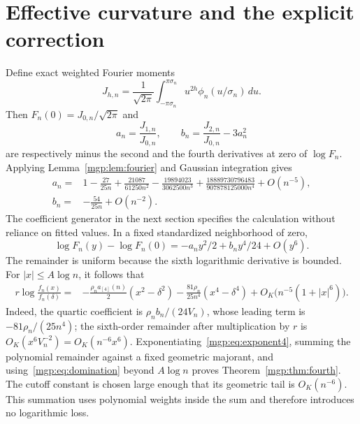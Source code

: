 \documentclass[11pt]{article}
\newcommand{\V}{V_n}\newcommand{\T}{T_{n,r}}\newcommand{\Z}{\mathbb Z}\newcommand{\E}{\mathbb E}\newcommand{\dd}{\,d}
\begin{document}
\section{Effective curvature and the explicit correction}
Define exact weighted Fourier moments
\[
 J_{h,n}=\frac1{\sqrt{2\pi}}
 \int_{-\pi\sigma_n}^{\pi\sigma_n}u^{2h}\phi_n(u/\sigma_n)\dd u.
\]
Then $F_n(0)=J_{0,n}/\sqrt{2\pi}$ and
\[
 a_n=\frac{J_{1,n}}{J_{0,n}},\qquad
 b_n=\frac{J_{2,n}}{J_{0,n}}-3a_n^2
\]
are respectively minus the second and the fourth derivatives at zero of $\log F_n$. Applying Lemma~\ref{mgp:lem:fourier} and Gaussian integration gives
\begin{align}
 a_n={}&1-\frac{27}{25n}+\frac{21087}{61250n^2}
 -\frac{19894023}{3062500n^3}
 +\frac{18889730796483}{907878125000n^4}+O(n^{-5}),\label{mgp:eq:a}\\
 b_n={}&-\frac{54}{25n}+O(n^{-2}).\label{mgp:eq:b}
\end{align}
The coefficient generator in the next section specifies the calculation without reliance on fitted values. In a fixed standardized neighborhood of zero,
\[
 \log F_n(y)-\log F_n(0)=-a_ny^2/2+b_ny^4/24+O(y^6).
\]
The remainder is uniform because the sixth logarithmic derivative is bounded. For $|x|\le A\log n$, it follows that
\begin{align}
 r\log\frac{f_n(x)}{f_n(\delta)}
 ={}&-\frac{\rho_n a_{[4]}(n)}2(x^2-\delta^2)
 -\frac{81\rho_n}{25n^4}(x^4-\delta^4)
 +O_K\bigl(n^{-5}(1+|x|^6)\bigr).\label{mgp:eq:exponent4}
\end{align}
Indeed, the quartic coefficient is $\rho_n b_n/(24\V)$, whose leading term is $-81\rho_n/(25n^4)$; the sixth-order remainder after multiplication by $r$ is $O_K(x^6\V^{-2})=O_K(n^{-6}x^6)$. Exponentiating~\eqref{mgp:eq:exponent4}, summing the polynomial remainder against a fixed geometric majorant, and using~\eqref{mgp:eq:domination} beyond $A\log n$ proves Theorem~\ref{mgp:thm:fourth}. The cutoff constant is chosen large enough that its geometric tail is $O_K(n^{-6})$. This summation uses polynomial weights inside the sum and therefore introduces no logarithmic loss.
\end{document}
